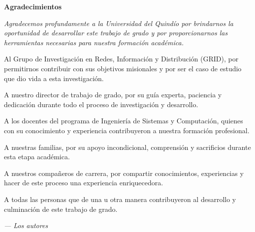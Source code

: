 \cleardoublepage
{}
\thispagestyle{empty}

\vspace*{\fill} %

\begin{center}
{\Large\bfseries Agradecimientos}
\end{center}

\vspace{2cm}

{\centering
{\itshape
Agradecemos profundamente a la Universidad del Quindío por brindarnos la oportunidad de desarrollar este trabajo de grado y por proporcionarnos las herramientas necesarias para nuestra formación académica.

Al Grupo de Investigación en Redes, Información y Distribución (GRID), por permitirnos contribuir con sus objetivos misionales y por ser el caso de estudio que dio vida a esta investigación.

A nuestro director de trabajo de grado, por su guía experta, paciencia y dedicación durante todo el proceso de investigación y desarrollo.

A los docentes del programa de Ingeniería de Sistemas y Computación, quienes con su conocimiento y experiencia contribuyeron a nuestra formación profesional.

A nuestras familias, por su apoyo incondicional, comprensión y sacrificios durante esta etapa académica.

A nuestros compañeros de carrera, por compartir conocimientos, experiencias y hacer de este proceso una experiencia enriquecedora.

A todas las personas que de una u otra manera contribuyeron al desarrollo y culminación de este trabajo de grado.
}

\vspace{2cm}

\hfill \textit{--- Los autores}

}

\vspace*{\fill} %